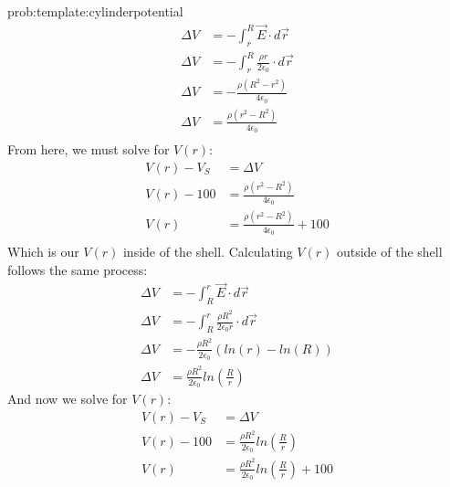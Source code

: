 \begin{solution}{prob:template:cylinderpotential}
	\begin{align*}
	\Delta V &= -\int_{r}^{R} \vec E\cdot d \vec r\\
	\Delta V & = -\int_{r}^{R} \frac{\rho r}{2\epsilon_0} \cdot d \vec r\\
	\Delta V & = -\frac{\rho (R^2-r^2)}{4\epsilon_0}\\
	\Delta V & = \frac{\rho (r^2-R^2)}{4\epsilon_0}\\
	\end{align*}
	From here, we must solve for $V(r)$:
	\begin{align*}
	V(r)-V_S &= \Delta V\\
	 V(r)-100 & = \frac{\rho (r^2-R^2)}{4\epsilon_0}\\
	V(r)& = \frac{\rho (r^2-R^2)}{4\epsilon_0} + 100\\
	\end{align*}
	Which is our $V(r)$ inside of the shell. Calculating $V(r)$ outside of the shell follows the same process:
	\begin{align*}
	\Delta V &= -\int_{R}^{r} \vec E\cdot d \vec r\\
	\Delta V &= -\int_{R}^{r} \frac{\rho R^2}{2\epsilon_0 r} \cdot d \vec r\\
	\Delta V & = -\frac{\rho R^2}{2\epsilon_0}(ln(r)-ln(R))\\
	\Delta V & = \frac{\rho R^2}{2\epsilon_0}ln(\frac{R}{r})
	\end{align*}
	And now we solve for $V(r)$:
	\begin{align*}
	V(r)-V_S &= \Delta V\\
	V(r)-100 &= \frac{\rho R^2}{2\epsilon_0}ln(\frac{R}{r})\\
	V(r) & = \frac{\rho R^2}{2\epsilon_0}ln(\frac{R}{r})+100\\
	\end{align*}
	
	
\end{solution}

